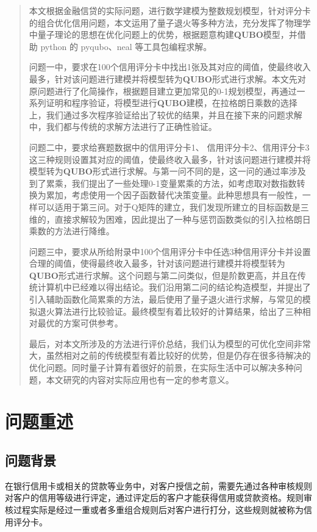 \documentclass{MathorCupmodeling}
\begin{document}
	\begin{abstract}
本文根据金融信贷的实际问题，进行数学建模为整数规划模型，针对评分卡的组合优化信用问题，本文运用了量子退火等多种方法，充分发挥了物理学中量子理论的思想在优化问题上的优势，根据题意构建\textbf{QUBO}模型，并借助 python 的 pyqubo、neal 等工具包编程求解。
  
        问题一中，要求在100个信用评分卡中找出1张及其对应的阈值，使最终收入最多，针对该问题进行建模并将模型转为\textbf{QUBO}形式进行求解。本文先对原问题进行了化简操作，根据题目建立更加常见的0-1规划模型，再通过一系列证明和程序验证，将模型进行\textbf{QUBO}建模，在拉格朗日乘数的选择上，我们通过多次程序验证给出了较优的结果，并且在接下来的问题求解中，我们都与传统的求解方法进行了正确性验证。
        
       问题二中，要求给赛题数据中的信用评分卡1、 信用评分卡2、信用评分卡3这三种规则设置其对应的阈值，使最终收入最多，针对该问题进行建模并将模型转为\textbf{QUBO}形式进行求解。与第一问不同的是，这一问的通过率涉及到了累乘，我们提出了一些处理0-1变量累乘的方法，如考虑取对数指数转换为累加，考虑使用一个因子函数替代决策变量。此种思想具有一般性，一样可以适用于第三问。对于Q矩阵的建立，我们发现所建立的目标函数是三维的，直接求解较为困难，因此提出了一种与惩罚函数类似的引入拉格朗日乘数的方法进行降维。
       
        问题三中，要求从所给附录中100个信用评分卡中任选3种信用评分卡并设置合理的阈值，使得最终收入最多，针对该问题进行建模并将模型转为\textbf{QUBO}形式进行求解。这个问题与第二问类似，但是阶数更高，并且在传统计算机中已经难以得出结论。我们沿用第二问的结论构造模型，并提出了引入辅助函数化简累乘的方法，最后使用了量子退火进行求解，与常见的模拟退火算法进行比较验证。最终模型有着比较好的计算结果，给出了三种相对最优的方案可供参考。

最后，对本文所涉及的方法进行评价总结，我们认为模型的可优化空间非常大，虽然相对之前的传统模型有着比较好的优势，但是仍存在很多待解决的优化问题。同时量子计算有着很好的前景，在实际生活中可以解决多种问题，本文研究的内容对实际应用也有一定的参考意义。
	\end{abstract}
	\tableofcontents\newpage
	\section{问题重述}
	\subsection{问题背景}
   在银行信用卡或相关的贷款等业务中，对客户授信之前，需要先通过各种审核规则对客户的信用等级进行评定，通过评定后的客户才能获得信用或贷款资格。规则审核过程实际是经过一重或者多重组合规则后对客户进行打分，这些规则就被称为信用评分卡。
   
\end{document}
